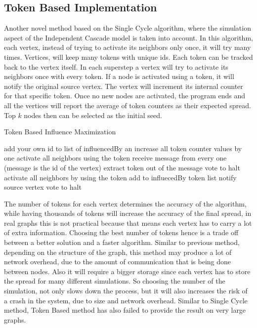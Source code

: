 \documentclass[english]{tktltiki}
\begin{document}
\subsection{Token Based Implementation}
Another novel method based on the Single Cycle algorithm, where the simulation aspect of the Independent Cascade model is taken into account. In this algorithm, each vertex, instead of trying to activate its neighbors only once, it will try many times. Vertices, will keep many tokens with unique ids. Each token can be tracked back to the vertex itself. In each superstep a vertex will try to activate its neighbors once with every token. If a node is activated using a token, it will notify the original source vertex. The vertex will increment its internal counter for that specific token. Once no new nodes are activated, the program ends and all the vertices will report the average of token counters as their expected spread. Top $k$ nodes then can be selected as the initial seed.
\begin{algorithm}[ht!]
\caption{Token Based Influence Maximization}
\begin{algorithmic}
	\State add your own id to list of influencedBy an increase all token counter values by one
		\State activate all neighbors using the token
	\EndFor
\Else
	\State receive message from every one (message is the id of the vertex)
		\State extract token out of the message
			\State vote to halt
		\Else
			\State activate all neighbors by using the token
			\State add to influecedBy token list 
			\State notify source vertex
			\State vote to halt
		\EndIf
		
	\EndFor
\EndIf
\end{algorithmic}
\end{algorithm}
The number of tokens for each vertex determines the accuracy of the algorithm, while having thousands of tokens will increase the accuracy of the final spread, in real graphs this is not practical because that means each vertex has to carry a lot of extra information. Choosing the best number of tokens hence is a trade off between a better solution and a faster algorithm. Similar to previous method, depending on the structure of the graph, this method may produce a lot of network overhead, due to the amount of communication that is being done between nodes. Also it will require a bigger storage since each vertex has to store the spread for many different simulations. So choosing the number of the simulation, not only slows down the process, but it will also increases the risk of a crash in the system, due to size and network overhead. Similar to Single Cycle method, Token Based method has also failed to provide the result on very large graphs.
\end{document}
